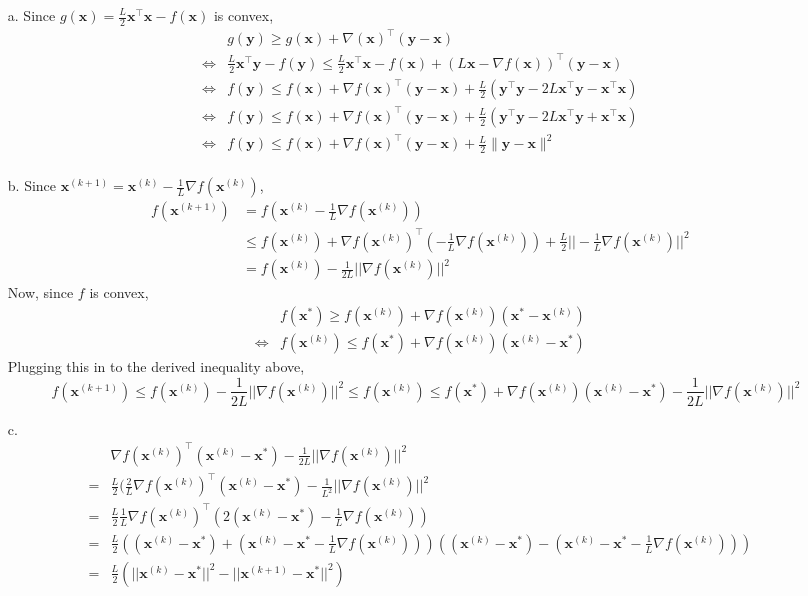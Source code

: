 \documentclass[11pt]{article}
\theoremstyle{remark}
\newcommand{\bx}{\mathbf{x}}
\newcommand{\by}{\mathbf{y}}
\begin{document}
\color{blue}
\begin{itemize}

\item[a.] Since $g(\bx)=\frac{L}{2} \bx^\intercal\bx - f(\bx)$ is convex,
\begin{align*}
& g(\by) \geq g(\bx) + \nabla (\bx)^\intercal(\by-\bx) &\\
\Leftrightarrow & \frac{L}{2} \bx^\intercal \by - f(\by) \leq \frac{L}{2} \bx^\intercal \bx - f(\bx)+(L\bx-\nabla f(\bx))^\intercal (\by-\bx) &\\
\Leftrightarrow &  f(\by) \leq f(\bx) + \nabla f(\bx)^\intercal (\by-\bx) + \frac{L}{2} (\by^\intercal \by -2L\bx^\intercal \by - \bx^\intercal \bx) &\\
\Leftrightarrow &  f(\by) \leq f(\bx) + \nabla f(\bx)^\intercal (\by-\bx) + \frac{L}{2} (\by^\intercal \by -2L\bx^\intercal \by + \bx^\intercal \bx) &\\
\Leftrightarrow &  f(\by) \leq f(\bx) + \nabla f(\bx)^\intercal (\by-\bx) + \frac{L}{2} \|\by-\bx\|^2 &\\
\end{align*}

\item[b.]
Since $\bx^{(k+1)}=\bx^{(k)}-\frac{1}{L}\nabla f(\bx^{(k)})$,
\begin{align*}
f(\bx^{(k+1)})&=f(\bx^{(k)}-\frac{1}{L}\nabla f(\bx^{(k)})) &\\
&\leq f(\bx^{(k)}) + \nabla f(\bx^{(k)})^\intercal (-\frac{1}{L}\nabla f(\bx^{(k)})) + \frac{L}{2}||-\frac{1}{L} \nabla f(\bx^{(k)})||^2 &\\
&= f(\bx^{(k)}) - \frac{1}{2L} ||\nabla f(\bx^{(k)})||^2
\end{align*}
Now, since $f$ is convex,
\begin{align*}
& f(\bx^*) \geq f(\bx^{(k)}) + \nabla f(\bx^{(k)})(\bx^*-\bx^{(k)}) &\\
\Leftrightarrow & f(\bx^{(k)}) \leq f(\bx^*) + \nabla f(\bx^{(k)})(\bx^{(k)}-\bx^*)
\end{align*}
Plugging this in to the derived inequality above,
$$f(\bx^{(k+1)}) \leq f(\bx^{(k)}) - \frac{1}{2L} ||\nabla f(\bx^{(k)})||^2 \leq f(\bx^{(k)}) \leq f(\bx^*) + \nabla f(\bx^{(k)})(\bx^{(k)}-\bx^*)  - \frac{1}{2L} ||\nabla f(\bx^{(k)})||^2$$

\item[c.]
\begin{align*}
&\nabla f(\bx^{(k)})^\intercal (\bx^{(k)}-\bx^*) - \frac{1}{2L} ||\nabla f(\bx^{(k)})||^2 &\\
=&\frac{L}{2}(\frac{2}{L} \nabla f(\bx^{(k)})^\intercal (\bx^{(k)}-\bx^*)  - \frac{1}{L^2}||\nabla f(\bx^{(k)})||^2 &\\
=&\frac{L}{2} \frac{1}{L}\nabla f(\bx^{(k)})^\intercal (2(\bx^{(k)}-\bx^*) - \frac{1}{L}\nabla f(\bx^{(k)}))&\\
=&\frac{L}{2} ((\bx^{(k)}-\bx^*)+(\bx^{(k)}-\bx^*-\frac{1}{L}\nabla f(\bx^{(k)})))((\bx^{(k)}-\bx^*)-(\bx^{(k)}-\bx^*-\frac{1}{L}\nabla f(\bx^{(k)}))) &\\
=&\frac{L}{2} (||\bx^{(k)}-\bx^*||^2-||\bx^{(k+1)}-\bx^*||^2)
\end{align*}


\end{itemize}
\end{document}
